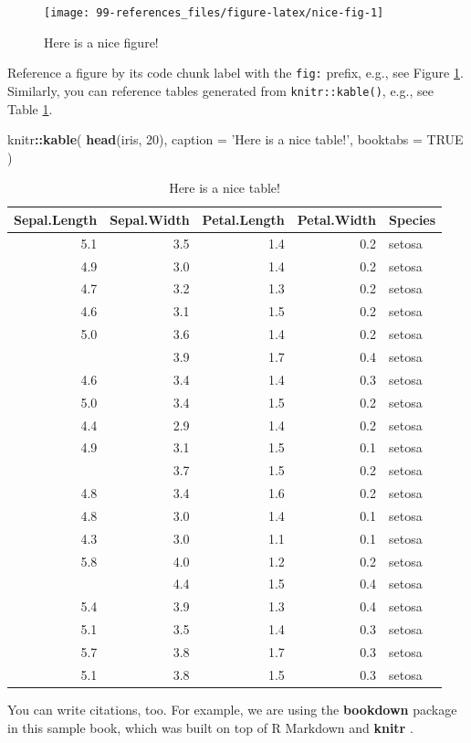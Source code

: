 \documentclass[]{book}
\newenvironment{Shaded}{\begin{snugshade}}{\end{snugshade}}
\newcommand{\KeywordTok}[1]{\textcolor[rgb]{0.13,0.29,0.53}{\textbf{#1}}}
\newcommand{\DataTypeTok}[1]{\textcolor[rgb]{0.13,0.29,0.53}{#1}}
\newcommand{\DecValTok}[1]{\textcolor[rgb]{0.00,0.00,0.81}{#1}}
\newcommand{\StringTok}[1]{\textcolor[rgb]{0.31,0.60,0.02}{#1}}
\newcommand{\OtherTok}[1]{\textcolor[rgb]{0.56,0.35,0.01}{#1}}
\newcommand{\OperatorTok}[1]{\textcolor[rgb]{0.81,0.36,0.00}{\textbf{#1}}}
\newcommand{\NormalTok}[1]{#1}
\begin{document}
\begin{figure}

{\centering \texttt{[image: 99-references\_files/figure-latex/nice-fig-1]} 

}

\caption{Here is a nice figure!}\label{fig:nice-fig}
\end{figure}

Reference a figure by its code chunk label with the \texttt{fig:}
prefix, e.g., see Figure \ref{fig:nice-fig}. Similarly, you can
reference tables generated from \texttt{knitr::kable()}, e.g., see Table
\ref{tab:nice-tab}.

\begin{Shaded}
\begin{Highlighting}[]
\NormalTok{knitr}\OperatorTok{::}\KeywordTok{kable}\NormalTok{(}
  \KeywordTok{head}\NormalTok{(iris, }\DecValTok{20}\NormalTok{), }\DataTypeTok{caption =} \StringTok{'Here is a nice table!'}\NormalTok{,}
  \DataTypeTok{booktabs =} \OtherTok{TRUE}
\NormalTok{)}
\end{Highlighting}
\end{Shaded}

\begin{table}

\caption{\label{tab:nice-tab}Here is a nice table!}
\centering
\begin{tabular}[t]{rrrrl}
\toprule
Sepal.Length & Sepal.Width & Petal.Length & Petal.Width & Species\\
\midrule
5.1 & 3.5 & 1.4 & 0.2 & setosa\\
4.9 & 3.0 & 1.4 & 0.2 & setosa\\
4.7 & 3.2 & 1.3 & 0.2 & setosa\\
4.6 & 3.1 & 1.5 & 0.2 & setosa\\
5.0 & 3.6 & 1.4 & 0.2 & setosa\\
\addlinespace
5.4 & 3.9 & 1.7 & 0.4 & setosa\\
4.6 & 3.4 & 1.4 & 0.3 & setosa\\
5.0 & 3.4 & 1.5 & 0.2 & setosa\\
4.4 & 2.9 & 1.4 & 0.2 & setosa\\
4.9 & 3.1 & 1.5 & 0.1 & setosa\\
\addlinespace
5.4 & 3.7 & 1.5 & 0.2 & setosa\\
4.8 & 3.4 & 1.6 & 0.2 & setosa\\
4.8 & 3.0 & 1.4 & 0.1 & setosa\\
4.3 & 3.0 & 1.1 & 0.1 & setosa\\
5.8 & 4.0 & 1.2 & 0.2 & setosa\\
\addlinespace
5.7 & 4.4 & 1.5 & 0.4 & setosa\\
5.4 & 3.9 & 1.3 & 0.4 & setosa\\
5.1 & 3.5 & 1.4 & 0.3 & setosa\\
5.7 & 3.8 & 1.7 & 0.3 & setosa\\
5.1 & 3.8 & 1.5 & 0.3 & setosa\\
\bottomrule
\end{tabular}
\end{table}

You can write citations, too. For example, we are using the
\textbf{bookdown} package \citep{R-bookdown} in this sample book, which
was built on top of R Markdown and \textbf{knitr} \citep{xie2015}.


\end{document}
